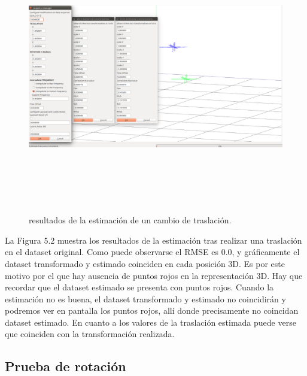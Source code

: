 \begin{figure}[h]
\label{fig:traslaTest}\includegraphics[height=12.0cm,width=18.0cm]{img/cap6/Traslation_abba.png}
\hspace{0.5cm}


\caption{resultados de la estimación de un cambio de traslación.}
\end{figure}


La Figura 5.2 muestra los resultados de la estimación tras realizar una traslación en el dataset original. Como puede observarse el RMSE es 0.0, y gráficamente el dataset transformado y estimado coinciden en cada posición 3D. Es por este motivo por el que hay ausencia de puntos rojos en la representación 3D. Hay que recordar que el dataset estimado se presenta con puntos rojos. Cuando la estimación no es buena, el dataset transformado y estimado no coincidirán y podremos ver en pantalla los puntos rojos, allí donde precisamente no coincidan dataset estimado. En cuanto a los valores de la traslación estimada puede verse que coinciden con la transformación realizada.

\subsection{Prueba de rotación}

